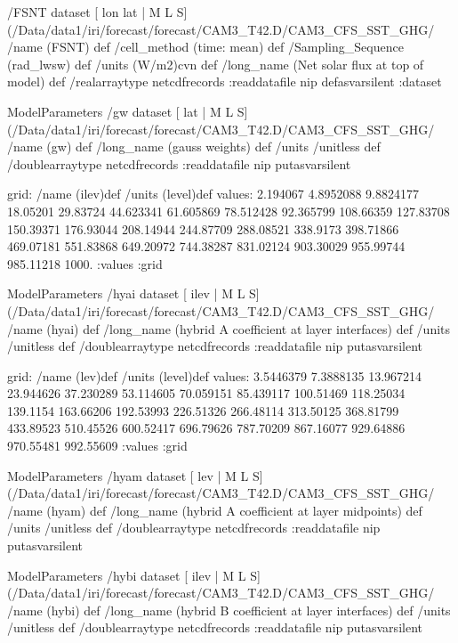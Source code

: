 \begin{ingrid}
 /FSNT{
dataset
[ lon lat | M L S] (/Data/data1/iri/forecast/forecast/CAM3_T42.D/CAM3_CFS_SST_GHG/%
/name (FSNT) def
 /cell_method (time: mean) def
 /Sampling_Sequence (rad_lwsw) def
 /units (W/m2)cvn def
 /long_name (Net solar flux at top of model) def
 /realarraytype netcdfrecords :readdatafile
nip
}defasvarsilent
:dataset

ModelParameters /gw{
dataset
[ lat | M L S] (/Data/data1/iri/forecast/forecast/CAM3_T42.D/CAM3_CFS_SST_GHG/%
/name (gw) def
 /long_name (gauss weights) def
 /units /unitless def
 /doublearraytype netcdfrecords :readdatafile
nip
}putasvarsilent

grid:
/name (ilev)def
/units (level)def
values: 2.194067 4.8952088 9.8824177 18.05201 29.83724 44.623341 61.605869 78.512428 92.365799 108.66359 127.83708 150.39371 176.93044 208.14944 244.87709 288.08521 338.9173 398.71866 469.07181 551.83868 649.20972 744.38287 831.02124 903.30029 955.99744 985.11218 1000. :values
:grid

ModelParameters  /hyai{
dataset
[ ilev | M L S] (/Data/data1/iri/forecast/forecast/CAM3_T42.D/CAM3_CFS_SST_GHG/%
/name (hyai) def
 /long_name (hybrid A coefficient at layer interfaces) def
 /units /unitless def
 /doublearraytype netcdfrecords :readdatafile
nip
}putasvarsilent


grid:
/name (lev)def
/units (level)def
values: 3.5446379 7.3888135 13.967214 23.944626 37.230289 53.114605 70.059151 85.439117 100.51469 118.25034 139.1154 163.66206 192.53993 226.51326 266.48114 313.50125 368.81799 433.89523 510.45526 600.52417 696.79626 787.70209 867.16077 929.64886 970.55481 992.55609 :values
:grid

ModelParameters /hyam{
dataset
[ lev | M L S] (/Data/data1/iri/forecast/forecast/CAM3_T42.D/CAM3_CFS_SST_GHG/%
/name (hyam) def
 /long_name (hybrid A coefficient at layer midpoints) def
 /units /unitless def
 /doublearraytype netcdfrecords :readdatafile
nip
}putasvarsilent

ModelParameters /hybi{
dataset
[ ilev | M L S] (/Data/data1/iri/forecast/forecast/CAM3_T42.D/CAM3_CFS_SST_GHG/%
/name (hybi) def
 /long_name (hybrid B coefficient at layer interfaces) def
 /units /unitless def
 /doublearraytype netcdfrecords :readdatafile
nip
}putasvarsilent


\end{ingrid}
